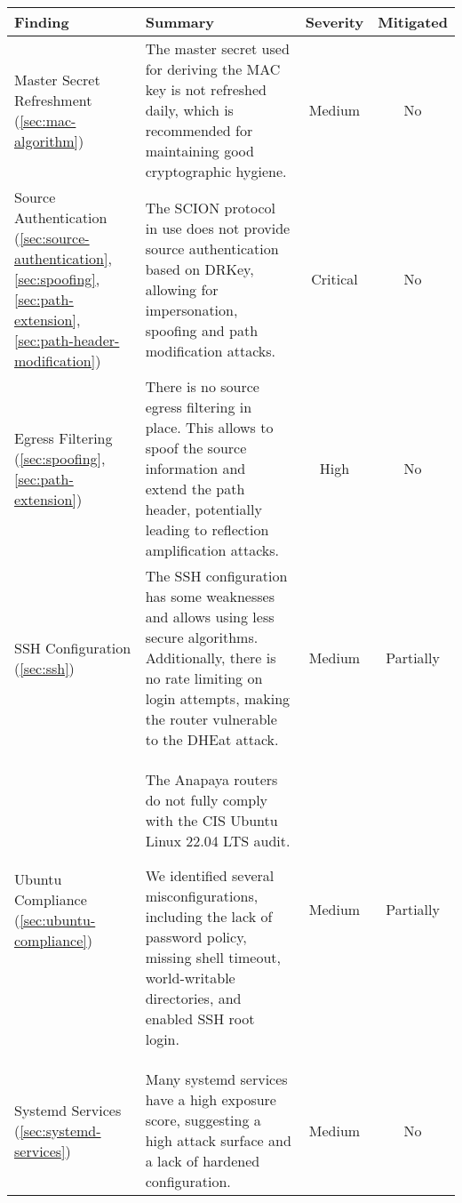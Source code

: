 \renewcommand{\arraystretch}{1.2} %
\begin{tabularx}{\textwidth}{|C{3cm}|X|c|c|}
    \hline
    \textbf{Finding} & \textbf{Summary} & \textbf{Severity} & \textbf{Mitigated} 
    \\ \hline

    Master Secret Refreshment (\cref{sec:mac-algorithm}) &
    The master secret used for deriving the MAC key is not refreshed daily, which is recommended for maintaining good cryptographic hygiene. &
    Medium &
    No
    \\ \hline

    Source Authentication (\cref{sec:source-authentication}, \cref{sec:spoofing}, \cref{sec:path-extension}, \cref{sec:path-header-modification}) &
    The SCION protocol in use does not provide source authentication based on DRKey, allowing for impersonation, spoofing and path modification attacks. &
    Critical &
    No
    \\ \hline

    Egress Filtering (\cref{sec:spoofing}, \cref{sec:path-extension}) &
    There is no source egress filtering in place.
    This allows to spoof the source information and extend the path header, potentially leading to reflection amplification attacks. &
    High &
    No
    \\ \hline

    SSH Configuration (\cref{sec:ssh}) &
    The SSH configuration has some weaknesses and allows using less secure algorithms.
    Additionally, there is no rate limiting on login attempts, making the router vulnerable to the DHEat attack. &
    Medium &
    Partially
    \\ \hline

    Ubuntu Compliance (\cref{sec:ubuntu-compliance}) &
    The Anapaya routers do not fully comply with the CIS Ubuntu Linux 22.04 LTS audit.

    We identified several misconfigurations, including the lack of password policy, missing shell timeout, world-writable directories, and enabled SSH root login. &
    Medium &
    Partially
    \\ \hline

    Systemd Services (\cref{sec:systemd-services}) &
    Many systemd services have a high exposure score, suggesting a high attack surface and a lack of hardened configuration. &
    Medium &
    No
    \\ \hline


\end{tabularx}
